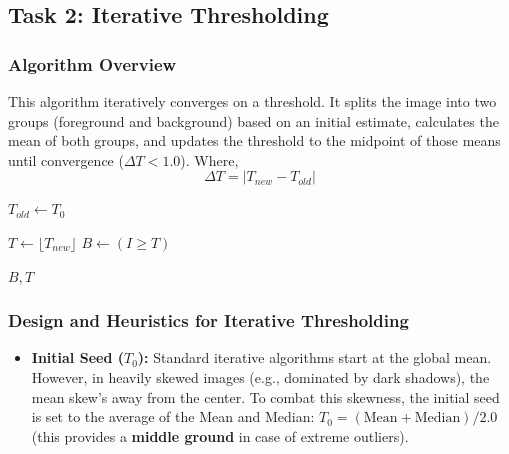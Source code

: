 \documentclass[11pt, letterpaper]{article}
\begin{document}
\subsection{Task 2: Iterative Thresholding}
\subsubsection{Algorithm Overview}
This algorithm iteratively converges on a threshold. It splits the image into two groups (foreground and background) based on an initial estimate, calculates the mean of both groups, and updates the threshold to the midpoint of those means until convergence ($\Delta T < 1.0$). Where, \[\Delta T = |T_{new} - T_{old}|\]

\begin{algorithm}[H]
\DontPrintSemicolon
{}


$T_{old} \leftarrow T_0$\;


$T \leftarrow \lfloor T_{new} \rfloor$\;
$B \leftarrow (I \ge T)$\;

\Return $B, T$\;
\caption{Iterative Thresholding}
\end{algorithm}

\subsubsection{Design and Heuristics for Iterative Thresholding}
\begin{itemize}
    \item \textbf{Initial Seed ($T_0$):} Standard iterative algorithms start at the global mean. However, in heavily skewed images (e.g., dominated by dark shadows), the mean skew's away from the center. To combat this skewness, the initial seed is set to the average of the Mean and Median: $T_0 = (\text{Mean} + \text{Median}) / 2.0$ (this provides a \textbf{middle ground} in case of extreme outliers).
\end{itemize}
\newpage
\end{document}
